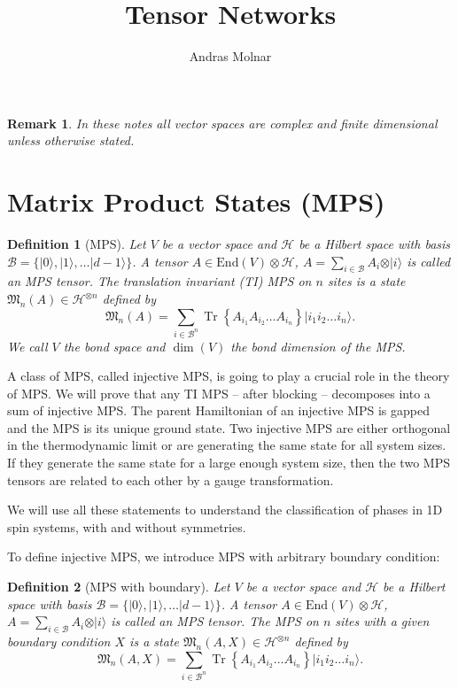 \documentclass{article}
\title{Tensor Networks}
\author{Andras Molnar}
\newtheorem{remark}{Remark}
\newtheorem{definition}{Definition}
\newcommand{\tr}{\operatorname{Tr}}
\newcommand{\End}{\mathrm{End}}
\newcommand{\ket}[1]{\vert #1 \rangle}
\begin{document}
\maketitle

\begin{remark}
	In these notes all vector spaces are complex and finite dimensional unless otherwise stated.
\end{remark}


\section{Matrix Product States (MPS)}

\begin{definition}[MPS]
  Let $V$ be a vector space and $\mathcal{H}$ be a Hilbert space with basis $\mathcal{B} = \{\ket{0},\ket{1},\dots \ket{d-1}\}$. A tensor $A\in \End(V)\otimes \mathcal{H}$, $A = \sum_{i\in \mathcal{B}} A_i \otimes \ket{i}$ is called an MPS tensor. The translation invariant (TI) MPS on $n$ sites is a state $\mathfrak{M}_n(A)\in \mathcal{H}^{\otimes n}$ defined by
  \begin{equation*}
  	\mathfrak{M}_n(A) = \sum_{i\in \mathcal{B}^n} \tr\left\{A_{i_1} A_{i_2} \dots A_{i_n}\right\} \ket{i_1 i_2 \dots i_n}.
  \end{equation*}
  We call $V$ the bond space and $\dim(V)$ the bond dimension of the MPS.
\end{definition}

A class of MPS, called injective MPS, is going to play a crucial role in the theory of MPS. We will prove that any TI MPS -- after blocking -- decomposes into a sum of injective MPS. The parent Hamiltonian of an injective MPS is gapped and the MPS is its unique ground state. Two injective MPS are either orthogonal in the thermodynamic limit or are generating the same state for all system sizes. If they generate the same state for a large enough system size, then the two MPS tensors are related to each other by a gauge transformation. 

We will use all these statements to understand the classification of phases in 1D spin systems, with and without symmetries. 

To define injective MPS, we introduce MPS with arbitrary boundary condition:
\begin{definition}[MPS with boundary]
  Let $V$ be a vector space and $\mathcal{H}$ be a Hilbert space with basis $\mathcal{B} = \{\ket{0},\ket{1},\dots \ket{d-1}\}$. A tensor $A\in \End(V)\otimes \mathcal{H}$, $A = \sum_{i\in \mathcal{B}} A_i \otimes \ket{i}$ is called an MPS tensor. The MPS on $n$ sites with a given boundary condition $X$ is a state $\mathfrak{M}_n(A,X)\in \mathcal{H}^{\otimes n}$ defined by
  \begin{equation*}
    \mathfrak{M}_n(A,X) = \sum_{i\in \mathcal{B}^n} \tr\left\{A_{i_1} A_{i_2} \dots A_{i_n}\right\} \ket{i_1 i_2 \dots i_n}.
  \end{equation*}
\end{definition}
\end{document}
